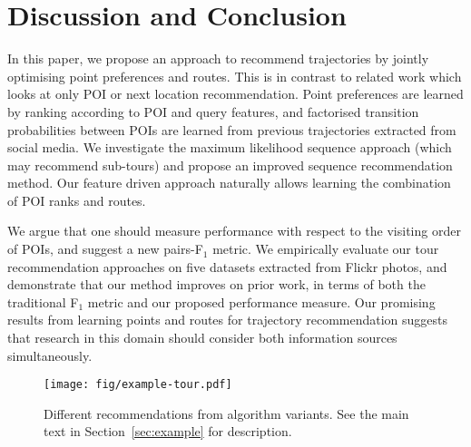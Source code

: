 
\section{Discussion and Conclusion}
\label{sec:conclusion}

In this paper, we propose an approach to recommend trajectories
by jointly optimising point preferences and routes.
This is in contrast to related work which looks at only POI %
or next location recommendation.
Point preferences are learned by ranking according to POI and query features,
and factorised transition probabilities between POIs
are learned from previous trajectories extracted
from social media.
We investigate the maximum likelihood sequence approach (which
may recommend sub-tours) and propose an improved sequence recommendation method.
Our feature driven approach naturally allows learning the combination of POI ranks and routes.

We argue that one should measure performance with respect to the visiting order of POIs,
and suggest a new pairs-F$_1$ metric.
We empirically evaluate our tour recommendation approaches on five datasets extracted from
Flickr photos, and demonstrate that our method improves on prior work,
in terms of both the traditional F$_1$ metric and our proposed performance measure.
Our promising results from learning points and routes for trajectory recommendation suggests
that research in this domain should consider both information sources simultaneously.


\begin{figure*}[t]
	\centering
	\texttt{[image: fig/example-tour.pdf]}
	\caption{Different recommendations from algorithm variants.
    See the main text in Section~\ref{sec:example} for description.}
	\label{fig:exampleresult}
\end{figure*}
